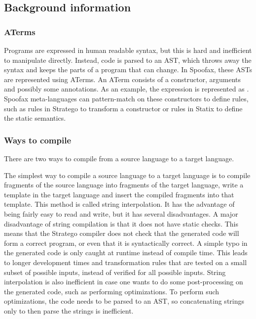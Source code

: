 \subsection{Background information}
\label{subsec:problem_analysis__background}

\subsubsection{ATerms}
\label{subsubsec:problem_analysis__background__aterms}

Programs are expressed in human readable syntax, but this is hard and inefficient to manipulate directly.
Instead, code is parsed to an \ac{AST}, which throws away the syntax and keeps the parts of a program that can change.
In Spoofax, these \acp{AST} are represented using ATerms.
An ATerm consists of a constructor, arguments and possibly some annotations.
As an example, the expression  is represented as .
Spoofax meta-languages can pattern-match on these constructors to define rules, such as rules in Stratego to transform a constructor or rules in Statix to define the static semantics.

\subsubsection{Ways to compile}
\label{subsubsec:problem_analysis__background__ways_to_compile}

There are two ways to compile from a source language to a target language.

The simplest way to compile a source language to a target language is to compile fragments of the source language into fragments of the target language, write a template in the target language and insert the compiled fragments into that template.
This method is called string interpolation.
It has the advantage of being fairly easy to read and write, but it has several disadvantages.
A major disadvantage of string compilation is that it does not have static checks.
This means that the Stratego compiler  does not check that the generated code will form a correct program, or even that it is syntactically correct.
A simple typo in the generated code is only caught at runtime instead of compile time.
This leads to longer development times and transformation rules that are tested on a small subset of possible inputs, instead of verified for all possible inputs.
String interpolation is also inefficient in case one wants to do some post-processing on the generated code, such as performing optimizations.
To perform such optimizations, the code needs to be parsed to an AST, so concatenating strings only to then parse the strings is inefficient.

